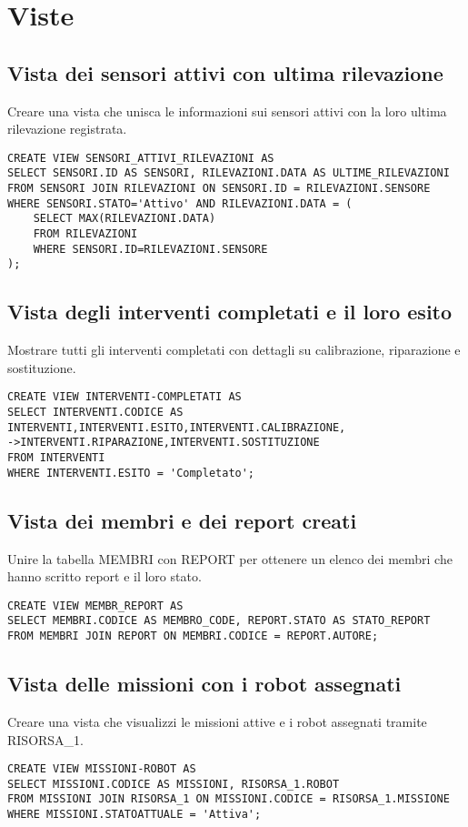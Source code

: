 \section{Viste}
\subsection{Vista dei sensori attivi con ultima rilevazione}
Creare una vista che unisca le informazioni sui sensori attivi con la loro ultima rilevazione registrata.
\begin{verbatim}
CREATE VIEW SENSORI_ATTIVI_RILEVAZIONI AS
SELECT SENSORI.ID AS SENSORI, RILEVAZIONI.DATA AS ULTIME_RILEVAZIONI
FROM SENSORI JOIN RILEVAZIONI ON SENSORI.ID = RILEVAZIONI.SENSORE
WHERE SENSORI.STATO='Attivo' AND RILEVAZIONI.DATA = (
    SELECT MAX(RILEVAZIONI.DATA)
    FROM RILEVAZIONI
    WHERE SENSORI.ID=RILEVAZIONI.SENSORE
);
\end{verbatim}
\subsection{Vista degli interventi completati e il loro esito}
Mostrare tutti gli interventi completati con dettagli su calibrazione, riparazione e sostituzione.
\begin{verbatim}
CREATE VIEW INTERVENTI-COMPLETATI AS
SELECT INTERVENTI.CODICE AS INTERVENTI,INTERVENTI.ESITO,INTERVENTI.CALIBRAZIONE,
->INTERVENTI.RIPARAZIONE,INTERVENTI.SOSTITUZIONE
FROM INTERVENTI
WHERE INTERVENTI.ESITO = 'Completato';
\end{verbatim}
\subsection{Vista dei membri e dei report creati}
Unire la tabella MEMBRI con REPORT per ottenere un elenco dei membri che hanno scritto report e il loro stato.
\begin{verbatim}
CREATE VIEW MEMBR_REPORT AS
SELECT MEMBRI.CODICE AS MEMBRO_CODE, REPORT.STATO AS STATO_REPORT
FROM MEMBRI JOIN REPORT ON MEMBRI.CODICE = REPORT.AUTORE;
\end{verbatim}
\subsection{Vista delle missioni con i robot assegnati}
Creare una vista che visualizzi le missioni attive e i robot assegnati tramite RISORSA\_1.
\begin{verbatim}
CREATE VIEW MISSIONI-ROBOT AS
SELECT MISSIONI.CODICE AS MISSIONI, RISORSA_1.ROBOT
FROM MISSIONI JOIN RISORSA_1 ON MISSIONI.CODICE = RISORSA_1.MISSIONE
WHERE MISSIONI.STATOATTUALE = 'Attiva'; 
\end{verbatim}
